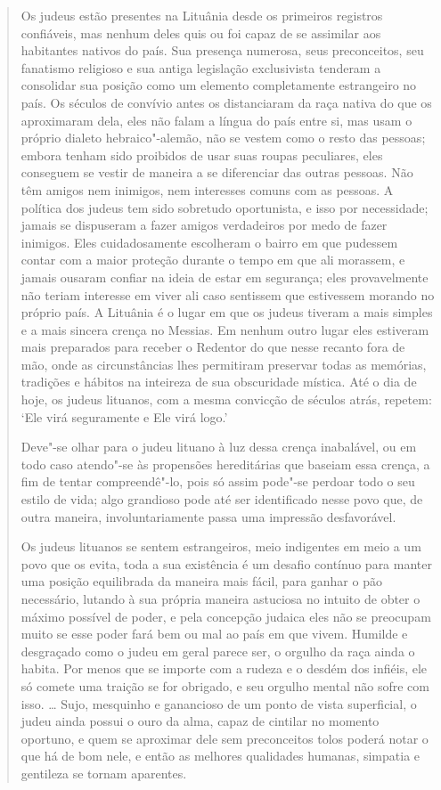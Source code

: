 \begin{quote}
Os judeus estão presentes na Lituânia desde os primeiros registros
confiáveis, mas nenhum deles quis ou foi capaz de se assimilar aos
habitantes nativos do país. Sua presença numerosa, seus preconceitos,
seu fanatismo religioso e sua antiga legislação exclusivista tenderam a
consolidar sua posição como um elemento completamente estrangeiro no
país. Os séculos de convívio antes os distanciaram da raça nativa do que
os aproximaram dela, eles não falam a língua do país entre si, mas usam
o próprio dialeto hebraico"-alemão, não se vestem como o resto das
pessoas; embora tenham sido proibidos de usar suas roupas peculiares,
eles conseguem se vestir de maneira a se diferenciar das outras pessoas.
Não têm amigos nem inimigos, nem interesses comuns com as pessoas. A
política dos judeus tem sido sobretudo oportunista, e isso por
necessidade; jamais se dispuseram a fazer amigos verdadeiros por medo de
fazer inimigos. Eles cuidadosamente escolheram o bairro em que pudessem
contar com a maior proteção durante o tempo em que ali morassem, e
jamais ousaram confiar na ideia de estar em segurança; eles
provavelmente não teriam interesse em viver ali caso sentissem que
estivessem morando no próprio país. A Lituânia é o lugar em que os
judeus tiveram a mais simples e a mais sincera crença no Messias. Em
nenhum outro lugar eles estiveram mais preparados para receber o
Redentor do que nesse recanto fora de mão, onde as circunstâncias lhes
permitiram preservar todas as memórias, tradições e hábitos na inteireza
de sua obscuridade mística. Até o dia de hoje, os judeus lituanos, com a
mesma convicção de séculos atrás, repetem: `Ele virá seguramente e Ele
virá logo.'

Deve"-se olhar para o judeu lituano à luz dessa crença inabalável, ou em
todo caso atendo"-se às propensões hereditárias que baseiam essa crença,
a fim de tentar compreendê"-lo, pois só assim pode"-se perdoar todo o seu
estilo de vida; algo grandioso pode até ser identificado nesse povo que,
de outra maneira, involuntariamente passa uma impressão desfavorável.

Os judeus lituanos se sentem estrangeiros, meio indigentes em meio a um
povo que os evita, toda a sua existência é um desafio contínuo para
manter uma posição equilibrada da maneira mais fácil, para ganhar o pão
necessário, lutando à sua própria maneira astuciosa no intuito de obter
o máximo possível de poder, e pela concepção judaica eles não se
preocupam muito se esse poder fará bem ou mal ao país em que vivem.
Humilde e desgraçado como o judeu em geral parece ser, o orgulho da raça
ainda o habita. Por menos que se importe com a rudeza e o desdém dos
infiéis, ele só comete uma traição se for obrigado, e seu orgulho mental
não sofre com isso. \ldots{} Sujo, mesquinho e ganancioso de um ponto de
vista superficial, o judeu ainda possui o ouro da alma, capaz de
cintilar no momento oportuno, e quem se aproximar dele sem preconceitos
tolos poderá notar o que há de bom nele, e então as melhores qualidades
humanas, simpatia e gentileza se tornam aparentes.


\end{quote}
